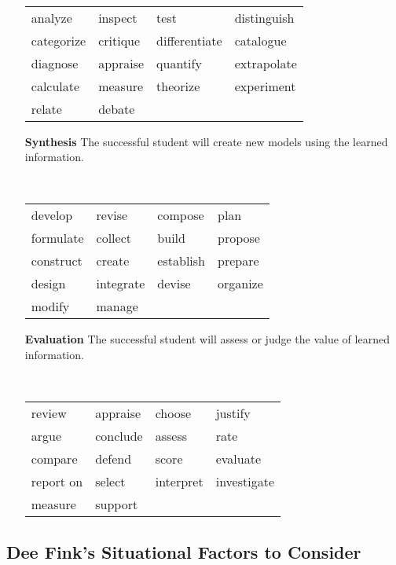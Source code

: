\documentclass{book}
\begin{document}
\begin{enumerate}
		\vspace{.1cm}
		~\begin{tabularx}{.7\textwidth}{|XXXX|}
			\hline
	analyze & inspect & test & distinguish\\
categorize & critique & differentiate & catalogue\\
diagnose & appraise & quantify & extrapolate\\
calculate & measure & theorize & experiment\\
			relate & debate&&\\\hline
		\end{tabularx}
		\vspace{.1cm}
	\item[\bfseries Synthesis] The successful student will create new models using the learned information.

		\vspace{.1cm}
		~\begin{tabularx}{.7\textwidth}{|XXXX|}
			\hline
develop & revise & compose & plan\\
formulate & collect & build & propose\\
construct & create & establish & prepare\\
design & integrate & devise & organize\\
			modify & manage&&\\\hline
		\end{tabularx}
		\vspace{.1cm}
	\item[\bfseries Evaluation] The successful student will assess or judge the value of learned information.

		\vspace{.1cm}
		~\begin{tabularx}{.7\textwidth}{|XXXX|}
			\hline
review & appraise & choose & justify\\
argue & conclude & assess & rate\\
compare & defend & score & evaluate\\
			report on & select & interpret &
			investigate \\ measure & support&&\\\hline
		\end{tabularx}
		\vspace{.1cm}
\end{enumerate}

\newpage
\subsection*{Dee Fink's Situational Factors to Consider}
\end{document}
